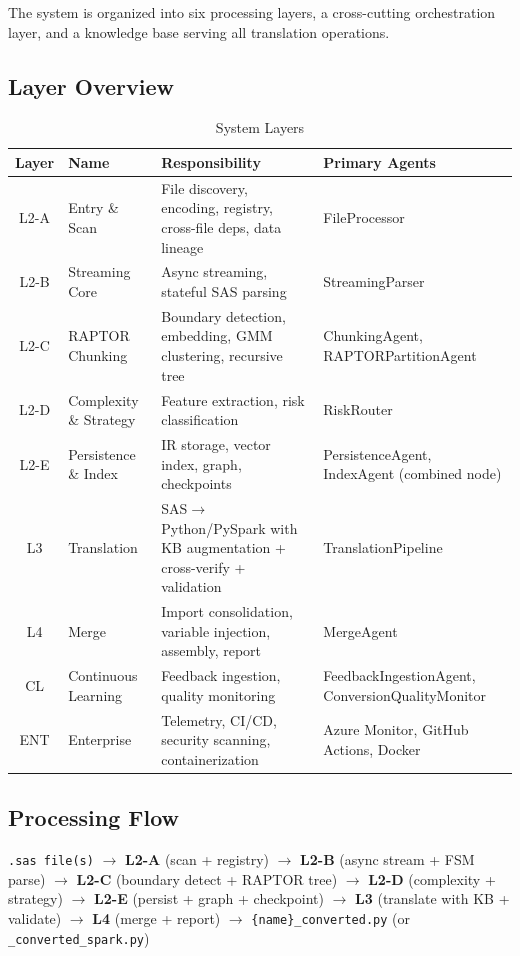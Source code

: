 \documentclass[11pt,a4paper]{article}
\begin{document}
The system is organized into six processing layers, a cross-cutting orchestration layer, and a knowledge base serving all translation operations.

\subsection{Layer Overview}

\begin{table}[H]
\centering
\caption{System Layers}
\renewcommand{\arraystretch}{1.35}
\small
\begin{tabularx}{\textwidth}{@{} c l L{4.5cm} X @{}}
\toprule
\textbf{Layer} & \textbf{Name} & \textbf{Responsibility} & \textbf{Primary Agents} \\
\midrule
L2-A & Entry \& Scan & File discovery, encoding, registry, cross-file deps, data lineage & FileProcessor \\
L2-B & Streaming Core & Async streaming, stateful SAS parsing & StreamingParser \\
L2-C & RAPTOR Chunking & Boundary detection, embedding, GMM clustering, recursive tree & ChunkingAgent, RAPTORPartitionAgent \\
L2-D & Complexity \& Strategy & Feature extraction, risk classification & RiskRouter \\
L2-E & Persistence \& Index & IR storage, vector index, graph, checkpoints & PersistenceAgent, IndexAgent (combined node) \\
L3 & Translation & SAS$\to$Python/PySpark with KB augmentation + cross-verify + validation & TranslationPipeline \\
L4 & Merge & Import consolidation, variable injection, assembly, report & MergeAgent \\
CL & Continuous Learning & Feedback ingestion, quality monitoring & FeedbackIngestionAgent, ConversionQualityMonitor \\
ENT & Enterprise & Telemetry, CI/CD, security scanning, containerization & Azure Monitor, GitHub Actions, Docker \\
\bottomrule
\end{tabularx}
\end{table}

\subsection{Processing Flow}

\begin{infobox}
\small
\texttt{.sas file(s)} $\longrightarrow$
\textbf{L2-A} (scan + registry) $\longrightarrow$
\textbf{L2-B} (async stream + FSM parse) $\longrightarrow$
\textbf{L2-C} (boundary detect + RAPTOR tree) $\longrightarrow$
\textbf{L2-D} (complexity + strategy) $\longrightarrow$
\textbf{L2-E} (persist + graph + checkpoint) $\longrightarrow$
\textbf{L3} (translate with KB + validate) $\longrightarrow$
\textbf{L4} (merge + report) $\longrightarrow$
\texttt{\{name\}\_converted.py} (or \texttt{\_converted\_spark.py})
\end{infobox}
\end{document}
